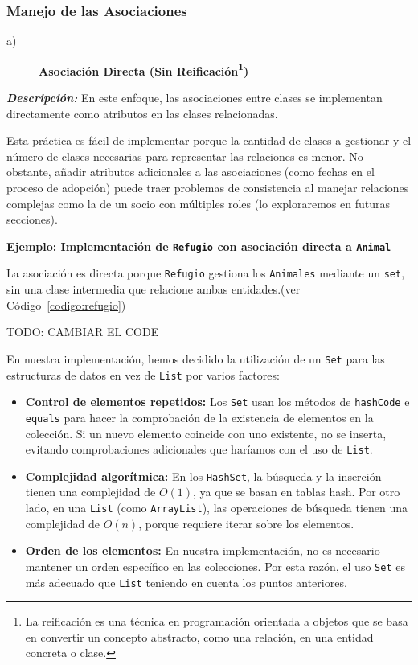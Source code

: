 \subsubsection{Manejo de las Asociaciones}

\begin{description}
    \item[a)] \textbf{Asociación Directa (Sin Reificación\footnote{
        La reificación es una técnica en programación 
        orientada a objetos que se basa en convertir un 
        concepto abstracto, como una relación, en una 
        entidad concreta o clase.})}
\end{description}

\textit{\textbf{Descripción:}}  
En este enfoque, las asociaciones entre clases se implementan directamente como atributos 
en las clases relacionadas.\par
\vspace{0.15cm}
Esta práctica es fácil de implementar porque la cantidad de clases a gestionar 
y el número de clases necesarias para representar las relaciones es menor. No obstante, 
añadir atributos adicionales a las asociaciones (como fechas en el proceso 
de adopción) puede traer problemas de consistencia al manejar relaciones complejas como la 
de un socio con múltiples roles (lo exploraremos en futuras secciones).\par
\newpage %
\textbf{Ejemplo: Implementación de \texttt{Refugio} con asociación directa a \texttt{Animal}}\par
La asociación es directa porque \texttt{Refugio} gestiona los \texttt{Animales} mediante un 
\texttt{set}, sin una clase intermedia que relacione ambas entidades.(ver Código~\ref{codigo:refugio})\par
TODO: CAMBIAR EL CODE\par
En nuestra implementación, hemos decidido la utilización de un \texttt{Set} para las estructuras de datos 
en vez de \texttt{List} por varios factores:

\begin{itemize}
    \item \textbf{Control de elementos repetidos:} Los \texttt{Set} usan los métodos de \texttt{hashCode} e \texttt{equals}
    para hacer la comprobación de la existencia de elementos en la colección. Si un nuevo elemento coincide con uno existente, 
    no se inserta, evitando comprobaciones adicionales que haríamos con el uso de \texttt{List}.
    \item \textbf{Complejidad algorítmica:} En los \texttt{HashSet}, la búsqueda y la inserción tienen una complejidad de \(O(1)\), 
    ya que se basan en tablas hash. Por otro lado, en una \texttt{List} (como \texttt{ArrayList}), las operaciones de búsqueda tienen una 
    complejidad de \(O(n)\), porque requiere iterar sobre los elementos.
    \item \textbf{Orden de los elementos:} En nuestra implementación, no es necesario mantener un orden específico en las colecciones. 
    Por esta razón, el uso \texttt{Set} es más adecuado que \texttt{List} teniendo en cuenta los puntos anteriores.
\end{itemize}
\vspace{0.45cm}


